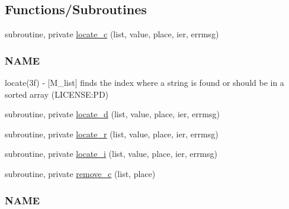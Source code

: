 \subsection*{Functions/\+Subroutines}
\begin{DoxyCompactItemize}
\item 
subroutine, private \mbox{\hyperlink{namespacem__list_aeb2a9d8e479c44cca127db7c65abb1f3}{locate\+\_\+c}} (list, value, place, ier, errmsg)
\begin{DoxyCompactList}\small\item\em \subsubsection*{N\+A\+ME}

locate(3f) -\/ \mbox{[}M\+\_\+list\mbox{]} finds the index where a string is found or should be in a sorted array (L\+I\+C\+E\+N\+SE\+:PD) \end{DoxyCompactList}\item 
subroutine, private \mbox{\hyperlink{namespacem__list_a6b746f0ad79a6fbfbafcf0ee22e38891}{locate\+\_\+d}} (list, value, place, ier, errmsg)
\item 
subroutine, private \mbox{\hyperlink{namespacem__list_a533a0e5b16558efb391913e881a57040}{locate\+\_\+r}} (list, value, place, ier, errmsg)
\item 
subroutine, private \mbox{\hyperlink{namespacem__list_a5b1b93df5003d6dce72acba89e779638}{locate\+\_\+i}} (list, value, place, ier, errmsg)
\item 
subroutine, private \mbox{\hyperlink{namespacem__list_a216c9ec18769ee63a769cc25bc273022}{remove\+\_\+c}} (list, place)
\begin{DoxyCompactList}\small\item\em \subsubsection*{N\+A\+ME}


\end{DoxyCompactList}
\end{DoxyCompactItemize}
